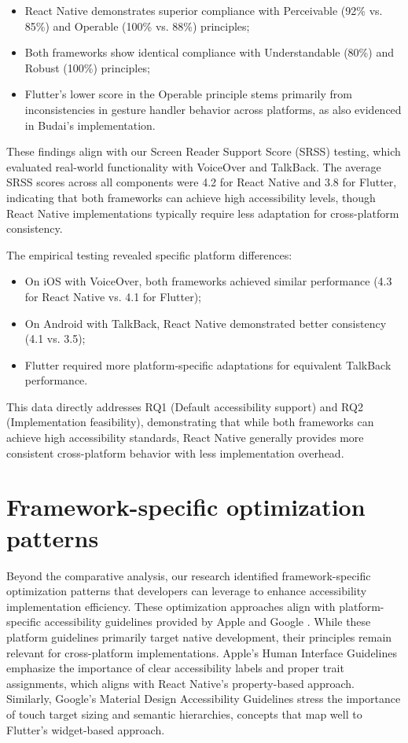 \begin{itemize}
    \item React Native demonstrates superior compliance with Perceivable (92\% vs. 85\%) and Operable (100\% vs. 88\%) principles;
    \item Both frameworks show identical compliance with Understandable (80\%) and Robust (100\%) principles;
    \item Flutter's lower score in the Operable principle stems primarily from inconsistencies in gesture handler behavior across platforms, as also evidenced in Budai's implementation.
\end{itemize}

These findings align with our Screen Reader Support Score (SRSS) testing, which evaluated real-world functionality with VoiceOver and TalkBack. The average SRSS scores across all components were 4.2 for React Native and 3.8 for Flutter, indicating that both frameworks can achieve high accessibility levels, though React Native implementations typically require less adaptation for cross-platform consistency.

The empirical testing revealed specific platform differences:

\begin{itemize}
    \item On iOS with VoiceOver, both frameworks achieved similar performance (4.3 for React Native vs. 4.1 for Flutter);
    \item On Android with TalkBack, React Native demonstrated better consistency (4.1 vs. 3.5);
    \item Flutter required more platform-specific adaptations for equivalent TalkBack performance.
\end{itemize}

This data directly addresses RQ1 (Default accessibility support) and RQ2 (Implementation feasibility), demonstrating that while both frameworks can achieve high accessibility standards, React Native generally provides more consistent cross-platform behavior with less implementation overhead.

\section{Framework-specific optimization patterns}
\label{sec:optimization-patterns}

Beyond the comparative analysis, our research identified framework-specific optimization patterns that developers can leverage to enhance accessibility implementation efficiency. 
These optimization approaches align with platform-specific accessibility guidelines provided by Apple \cite{apple-accessibility} and Google \cite{google-accessibility}. While these platform guidelines primarily target native development, their principles remain relevant for cross-platform implementations. Apple's Human Interface Guidelines emphasize the importance of clear accessibility labels and proper trait assignments, which aligns with React Native's property-based approach. Similarly, Google's Material Design Accessibility Guidelines stress the importance of touch target sizing and semantic hierarchies, concepts that map well to Flutter's widget-based approach.

